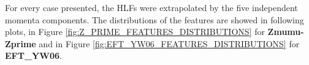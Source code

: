 For every case presented, the HLFs were extrapolated by the five independent momenta components. The distributions of the features are showed in following plots, in Figure \ref{fig:Z_PRIME_FEATURES_DISTRIBUTIONS} for \textbf{Zmumu-Zprime} and in Figure \ref{fig:EFT_YW06_FEATURES_DISTRIBUTIONS} for \textbf{EFT\_YW06}.


